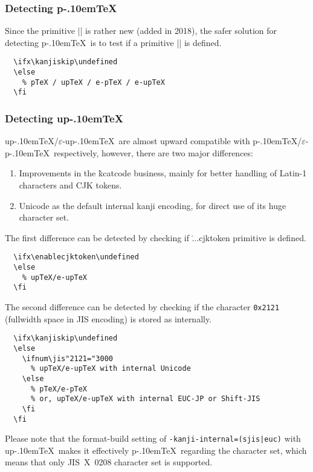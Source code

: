 \documentclass[a4paper,11pt,dvipdfmx]{article}
\def\code#1{\texttt{#1}}
\def\eTeXpre{$\varepsilon$-}
\def\epTeX{\leavevmode\hbox{\eTeXpre\pTeX}}
\def\eupTeX{\leavevmode\hbox{\eTeXpre\upTeX}}
\def\pTeX{p\kern-.10em\TeX}\def\upTeX{u\pTeX}
\begin{document}
\subsubsection{Detecting \pTeX}

Since the primitive |\ptexversion| is rather new (added in 2018),
the safer solution for detecting \pTeX\ is
to test if a primitive |\kanjiskip| is defined.
\begin{verbatim}
  \ifx\kanjiskip\undefined
  \else
    % pTeX / upTeX / e-pTeX / e-upTeX
  \fi
\end{verbatim}

\subsubsection{Detecting \upTeX}

\upTeX/\eupTeX\ are almost upward compatible
with \pTeX/\epTeX\ respectively, however,
there are two major differences:
\begin{enumerate}
  \item Improvements in the \.{kcatcode} business,
    mainly for better handling of Latin-1 characters and CJK tokens.
  \item Unicode as the default internal kanji encoding,
    for direct use of its huge character set.
\end{enumerate}

The first difference can be detected by checking if
\.{...cjktoken} primitive is defined.
\begin{verbatim}
  \ifx\enablecjktoken\undefined
  \else
    % upTeX/e-upTeX
  \fi
\end{verbatim}

The second difference can be detected by checking if
the character \code{0x2121} (fullwidth space in JIS encoding)
is stored as  internally.
\begin{verbatim}
  \ifx\kanjiskip\undefined
  \else
    \ifnum\jis"2121="3000
      % upTeX/e-upTeX with internal Unicode
    \else
      % pTeX/e-pTeX
      % or, upTeX/e-upTeX with internal EUC-JP or Shift-JIS
    \fi
  \fi
\end{verbatim}
Please note that
the format-build setting of \verb+-kanji-internal=(sjis|euc)+ with
\upTeX\ makes it effectively \pTeX\ regarding the character set,
which means that only JIS~X~0208 character set is supported.

\end{document}
